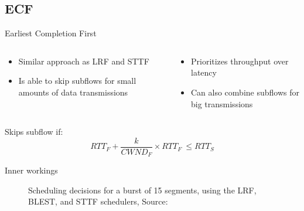 \documentclass{beamer}
\begin{document}
\subsection{ECF}
\begin{frame}{Earliest Completion First}
  \begin{columns}
    \begin{column}{0.48\textwidth}
      \begin{itemize}
        \setlength\itemsep{1.2em}
        \item Similar approach as LRF and STTF
        \item Is able to skip subflows for small amounts of data transmissions
      \end{itemize}
    \end{column}

    \begin{column}{0.48\textwidth}
      \begin{itemize}
        \setlength\itemsep{1.2em}
        \item Prioritizes throughput over latency
        \item Can also combine subflows for big transmissions
      \end{itemize}
    \end{column}
  \end{columns}


  \vspace{0.6cm}
  \begin{center}
    Skips subflow if:
    \begin{equation}
      RTT_F + \frac{k}{CWND_F}\times RTT_F\ \leq RTT_S
    \end{equation}
\end{center}
\end{frame}

\begin{frame}{Inner workings}
  \begin{figure}
    \centering
    \caption{\small Scheduling decisions for a burst of 15 segments, using the LRF, BLEST, and STTF schedulers, \textcolor{uos-grey-full}{Source: {\cite{blocking}}}}
  \end{figure}
\end{frame}
\end{document}
